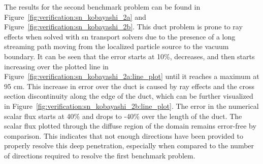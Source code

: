 The results for the second benchmark problem can be found in Figure~\ref{fig:verification:sn_kobayashi_2a} and Figure~\ref{fig:verification:sn_kobayashi_2b}. This duct problem is prone to ray effects when solved with \acrshort{sn} transport solvers due to the presence of a long streaming path moving from the localized particle source to the vacuum boundary. It can be seen that the error starts at 10\%, decreases, and then starts increasing over the plotted line in Figure~\ref{fig:verification:sn_kobayashi_2a:line_plot} until it reaches a maximum at 95 cm. This increase in error over the duct is caused by ray effects and the cross section discontinuity along the edge of the duct, which can be further visualized in Figure~\ref{fig:verification:sn_kobayashi_2b:line_plot}. The error in the numerical scalar flux starts at 40\% and drops to -40\% over the length of the duct. The scalar flux plotted through the diffuse region of the domain remains error-free by comparison. This indicates that not enough directions have been provided to properly resolve this deep penetration, especially when compared to the number of directions required to resolve the first benchmark problem.  
